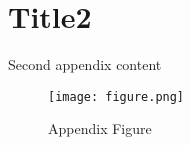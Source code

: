 \chapter{Title2}\label{apx:Title2}
Second appendix content

\begin{figure}
    \centering
    \texttt{[image: figure.png]}
    \caption{Appendix Figure}
    \label{fig:my test appendix figure}
\end{figure}